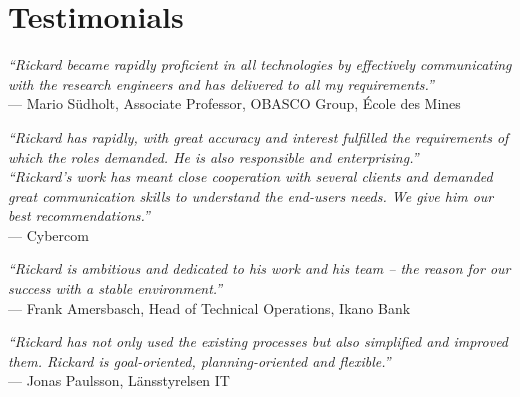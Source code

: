 \section{Testimonials}

{\small
\begin{quotelist}
  \item \textit{``Rickard became rapidly proficient in all technologies by effectively communicating with the research engineers and has delivered to all my requirements.''} \\
  — Mario Südholt, Associate Professor, OBASCO Group, École des Mines

  \item \textit{``Rickard has rapidly, with great accuracy and interest fulfilled the requirements of which the roles demanded. He is also responsible and enterprising.''} \\
  \textit{``Rickard’s work has meant close cooperation with several clients and demanded great communication skills to understand the end-users needs. We give him our best recommendations.''} \\
  — Cybercom

  \item \textit{``Rickard is ambitious and dedicated to his work and his team – the reason for our success with a stable environment.''} \\
  — Frank Amersbasch, Head of Technical Operations, Ikano Bank

  \item \textit{``Rickard has not only used the existing processes but also simplified and improved them. Rickard is goal-oriented, planning-oriented and flexible.''} \\
  — Jonas Paulsson, Länsstyrelsen IT
\end{quotelist}
}
